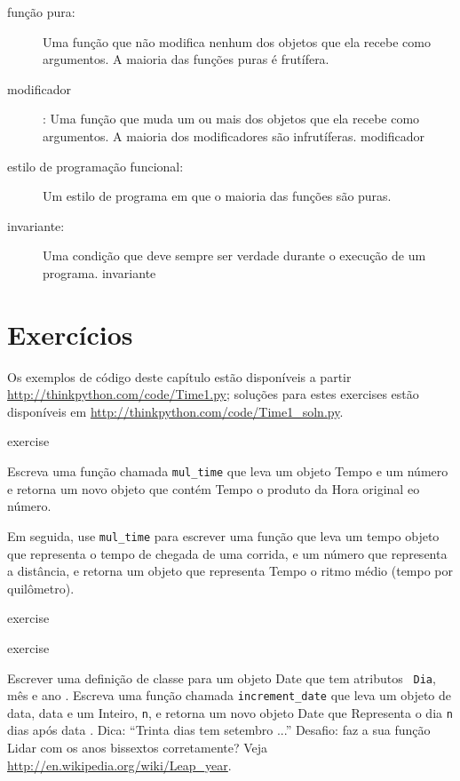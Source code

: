 \documentclass[10pt]{book}
\begin{document}
\begin{exercise}
\begin{v erbatim}
{\begin{description}
\item[função pura:] Uma função que não modifica nenhum dos objetos que ela
recebe como argumentos. A maioria das funções puras é frutífera.

\item[modificador]: Uma função que muda um ou mais dos objetos que ela
recebe como argumentos. A maioria dos modificadores são infrutíferas.
\index{} modificador

\item[estilo de programação funcional:] Um estilo de programa em que o
maioria das funções são puras.

\item[invariante:] Uma condição que deve sempre ser verdade durante o
execução de um programa.
\index{} invariante

\end{description}


\section{Exercícios}

Os exemplos de código deste capítulo estão disponíveis a partir
\url{http://thinkpython.com/code/Time1.py}; soluções para estes
exercises estão disponíveis em \url{http://thinkpython.com/code/Time1_soln.py}.

\begin{} exercise

Escreva uma função chamada \verb "mul_time" que leva um objeto Tempo
e um número e retorna um novo objeto que contém Tempo
o produto da Hora original eo número.

Em seguida, use \verb "mul_time" para escrever uma função que leva um tempo
objeto que representa o tempo de chegada de uma corrida, e um número
que representa a distância, e retorna um objeto que representa Tempo
o ritmo médio (tempo por quilômetro).

\end{} exercise

\begin{} exercise

Escrever uma definição de classe para um objeto Date que tem atributos {\tt
Dia}, {mês \tt} e {ano \tt}. Escreva uma função chamada
\Verb "increment_date" que leva um objeto de data, {data \tt} e um
Inteiro, {\tt n}, e retorna um novo objeto Date que
Representa o dia {\tt n} dias após {data \tt}. Dica:
``Trinta dias tem setembro ...'' Desafio: faz a sua função
Lidar com os anos bissextos corretamente? Veja \url{http://en.wikipedia.org/wiki/Leap_year}.


\end{}}
\end{v erbatim}
\end{exercise}
\end{document}
